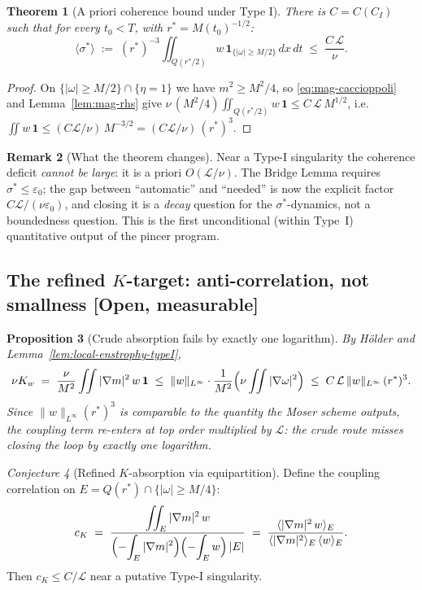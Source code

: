 \documentclass[11pt]{article}
\newtheorem{theorem}{Theorem}[section]
\newtheorem{proposition}[theorem]{Proposition}
\theoremstyle{definition}
\newtheorem{remark}[theorem]{Remark}
\theoremstyle{remark}
\newtheorem{conjecture}[theorem]{Conjecture}
\newcommand{\Xint}{\mathop{\mathchoice{\vcenter{\hbox{$\displaystyle-$}}}%
  {\vcenter{\hbox{$\textstyle-$}}}%
  {\vcenter{\hbox{$\scriptstyle-$}}}%
  {\vcenter{\hbox{$\scriptscriptstyle-$}}}}\!\int}
\providecommand{\fint}{\Xint}
\begin{document}
\begin{theorem}[A priori coherence bound under Type I]\label{thm:apriori-sigma}
  There is $C=C(C_I)$ such that for every $t_0<T$, with $r^*=M(t_0)^{-1/2}$:
  \[
    \langle\sigma^*\rangle
    \;:=\;
    (r^*)^{-3}\iint_{Q(r^*/2)} w\,\mathbf{1}_{\{|\omega|\geq M/2\}}\,dx\,dt
    \;\leq\; \frac{C\,\mathcal{L}}{\nu}.
  \]
\end{theorem}
\begin{proof}
  On $\{|\omega|\geq M/2\}\cap\{\eta=1\}$ we have $m^2\geq M^2/4$, so
  \eqref{eq:mag-caccioppoli} and Lemma~\ref{lem:mag-rhs} give
  $\nu\,(M^2/4)\iint_{Q(r^*/2)}w\,\mathbf{1} \leq C\,\mathcal{L}\,M^{1/2}$,
  i.e.\ $\iint w\,\mathbf{1} \leq (C\mathcal{L}/\nu)\,M^{-3/2}
  = (C\mathcal{L}/\nu)\,(r^*)^3$.
\end{proof}

\begin{remark}[What the theorem changes]
  Near a Type-I singularity the coherence deficit \emph{cannot be large}:
  it is a priori $O(\mathcal{L}/\nu)$. The Bridge Lemma requires
  $\sigma^*\leq\varepsilon_0$; the gap between ``automatic'' and ``needed''
  is now the explicit factor $C\mathcal{L}/(\nu\varepsilon_0)$, and closing
  it is a \emph{decay} question for the $\sigma^*$-dynamics, not a
  boundedness question. This is the first unconditional (within Type~I)
  quantitative output of the pincer program.
\end{remark}

\subsection{The refined $K$-target: anti-correlation, not smallness [Open, measurable]}

\begin{proposition}[Crude absorption fails by exactly one logarithm]
  \label{prop:crude-K}
  By H\"older and Lemma~\ref{lem:local-enstrophy-typeI},
  \[
    \nu K_w \;=\; \frac{\nu}{M^2}\iint |\nabla m|^2\,w\,\mathbf{1}
    \;\leq\; \|w\|_{L^\infty}\cdot
      \frac{1}{M^2}\Bigl(\nu\iint|\nabla\omega|^2\Bigr)
    \;\leq\; C\,\mathcal{L}\,\|w\|_{L^\infty}\,(r^*)^3 .
  \]
  Since $\|w\|_{L^\infty}(r^*)^3$ is comparable to the quantity the Moser
  scheme outputs, the coupling term re-enters at top order multiplied by
  $\mathcal{L}$: the crude route misses closing the loop by exactly one
  logarithm.
\end{proposition}

\begin{conjecture}[Refined $K$-absorption via equipartition]\label{conj:K-refined}
  Define the coupling correlation on
  $E = Q(r^*)\cap\{|\omega|\geq M/4\}$:
  \[
    c_K \;=\;
    \frac{\displaystyle\iint_E |\nabla m|^2\,w}
         {\displaystyle\Bigl(\fint_E|\nabla m|^2\Bigr)
          \Bigl(\fint_E w\Bigr)\,|E|}
    \;=\;
    \frac{\langle |\nabla m|^2\,w\rangle_E}
         {\langle|\nabla m|^2\rangle_E\,\langle w\rangle_E}.
  \]
  Then $c_K \leq C/\mathcal{L}$ near a putative Type-I singularity.
\end{conjecture}
\end{document}
